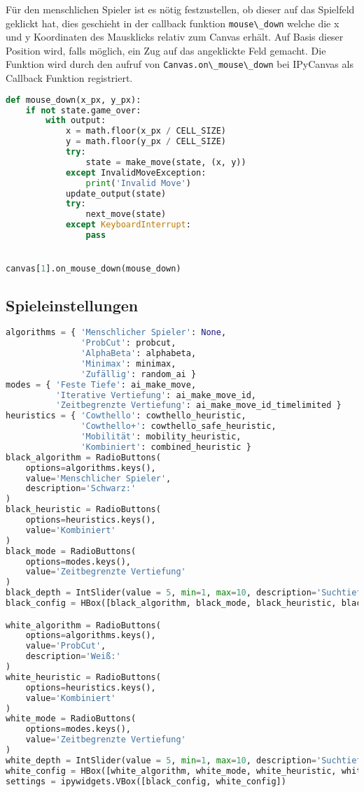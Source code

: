 Für den menschlichen Spieler ist es nötig festzustellen, ob dieser auf
das Spielfeld geklickt hat, dies geschieht in der callback funktion
\passthrough{\lstinline!mouse\_down!} welche die x und y Koordinaten des
Mausklicks relativ zum Canvas erhält. Auf Basis dieser Position wird,
falls möglich, ein Zug auf das angeklickte Feld gemacht. Die Funktion
wird durch den aufruf von
\passthrough{\lstinline!Canvas.on\_mouse\_down!} bei IPyCanvas als
Callback Funktion registriert.

\begin{lstlisting}[language=Python]
def mouse_down(x_px, y_px):
    if not state.game_over:
        with output:
            x = math.floor(x_px / CELL_SIZE)
            y = math.floor(y_px / CELL_SIZE)
            try:
                state = make_move(state, (x, y))
            except InvalidMoveException:
                print('Invalid Move')
            update_output(state)
            try:
                next_move(state)
            except KeyboardInterrupt:
                pass


canvas[1].on_mouse_down(mouse_down)
\end{lstlisting}

\hypertarget{spieleinstellungen}{%
\subsection{Spieleinstellungen}\label{spieleinstellungen}}

\begin{lstlisting}[language=Python]
algorithms = { 'Menschlicher Spieler': None,
               'ProbCut': probcut,
               'AlphaBeta': alphabeta,
               'Minimax': minimax,
               'Zufällig': random_ai }
modes = { 'Feste Tiefe': ai_make_move,
          'Iterative Vertiefung': ai_make_move_id,
          'Zeitbegrenzte Vertiefung': ai_make_move_id_timelimited }
heuristics = { 'Cowthello': cowthello_heuristic,
               'Cowthello+': cowthello_safe_heuristic,
               'Mobilität': mobility_heuristic,
               'Kombiniert': combined_heuristic }
black_algorithm = RadioButtons(
    options=algorithms.keys(),
    value='Menschlicher Spieler',
    description='Schwarz:'
)
black_heuristic = RadioButtons(
    options=heuristics.keys(),
    value='Kombiniert'
)
black_mode = RadioButtons(
    options=modes.keys(),
    value='Zeitbegrenzte Vertiefung'
)
black_depth = IntSlider(value = 5, min=1, max=10, description='Suchtiefe:')
black_config = HBox([black_algorithm, black_mode, black_heuristic, black_depth])

white_algorithm = RadioButtons(
    options=algorithms.keys(),
    value='ProbCut',
    description='Weiß:'
)
white_heuristic = RadioButtons(
    options=heuristics.keys(),
    value='Kombiniert'
)
white_mode = RadioButtons(
    options=modes.keys(),
    value='Zeitbegrenzte Vertiefung'
)
white_depth = IntSlider(value = 5, min=1, max=10, description='Suchtiefe:')
white_config = HBox([white_algorithm, white_mode, white_heuristic, white_depth])
settings = ipywidgets.VBox([black_config, white_config])
\end{lstlisting}


